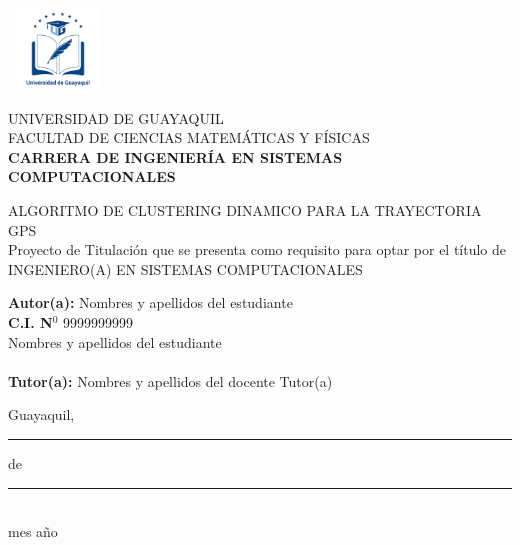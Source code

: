 \documentclass[12pt, a4paper, nofontenc, numbers=endperiod]{apa7}
\begin{document}
	{ %
		\begin{center}	
			\includegraphics[width=2.65cm,height=2.17cm]{Imagenes/Figura1}
		\end{center}
		\begin{center}	
			UNIVERSIDAD DE GUAYAQUIL \\[-0.1cm]
			FACULTAD DE CIENCIAS MATEMÁTICAS Y FÍSICAS \\ [-0.1cm]
			\textbf{ CARRERA DE INGENIERÍA EN SISTEMAS COMPUTACIONALES}
		\end{center}
		\begin{center}
			ALGORITMO DE CLUSTERING DINAMICO PARA LA TRAYECTORIA GPS \\
				
			\vspace*{1cm}	
			Proyecto de Titulación que se presenta como requisito para optar por el título de \\
			INGENIERO(A) EN SISTEMAS COMPUTACIONALES	
		\end{center}
		\vspace*{1.5cm}
		\begin{flushright}
			\begin{minipage}[b]{10cm}
				\hspace*{2.4cm}\textbf{Autor(a):} Nombres y apellidos del estudiante \\
				\hspace*{6.5cm}\textbf{C.I. N$^{0}$ }9999999999\\
				\hspace*{4.1cm}\color{red} Nombres y apellidos del estudiante \\
					\\
					\hspace*{1.2cm}\textbf{Tutor(a):} Nombres y apellidos del docente Tutor(a)
				\end{minipage}
			\end{flushright}
			\vspace*{0.7cm}
			\begin{center}
				\singlespacing Guayaquil,\rule[0mm]{10mm}{0.1mm} de \rule[0mm]{10mm}{0.1mm}\\
				\hspace{1.5cm} mes \hspace{0.5cm}  año
			\end{center}
		}
\end{document}

